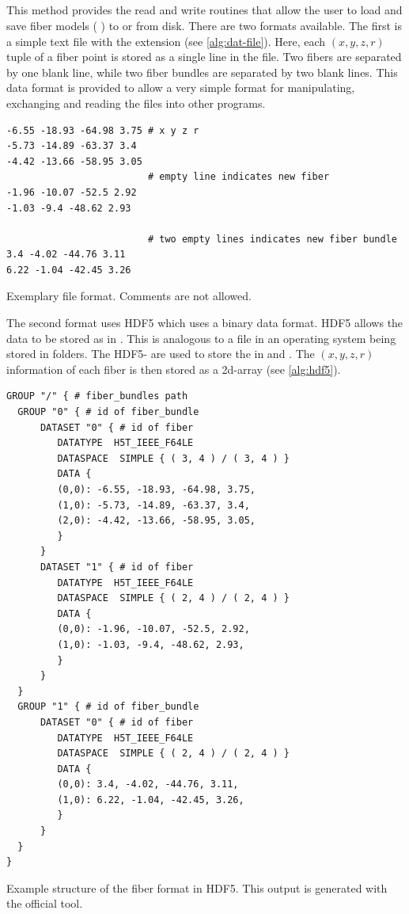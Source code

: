 \subsection{}
%
This method provides the read and write routines that allow the user to load and save fiber models (\ie{} ) to or from disk.
There are two formats available.
The first is a simple text file with the extension  (see \cref{alg:dat-file}).
Here, each $(x,y,z,r)$ tuple of a fiber point is stored as a single line in the file.
Two fibers are separated by one blank line, while two fiber bundles are separated by two blank lines.
This data format is provided to allow a very simple format for manipulating, exchanging and \eg{} reading the files into other programs.
\par
%
\begin{lstfloat}[!ht]
\begin{lstlisting}
-6.55 -18.93 -64.98 3.75 # x y z r
-5.73 -14.89 -63.37 3.4
-4.42 -13.66 -58.95 3.05
                         # empty line indicates new fiber
-1.96 -10.07 -52.5 2.92
-1.03 -9.4 -48.62 2.93

                         # two empty lines indicates new fiber bundle
3.4 -4.02 -44.76 3.11
6.22 -1.04 -42.45 3.26
\end{lstlisting}
\caption{Exemplary  file format. Comments are not allowed.}\label{alg:dat-file}
\end{lstfloat}
%
The second format uses \ac{HDF5} \cite{hdf5} which uses a binary data format.
\ac{HDF5} allows the data to be stored as  in .
This is analogous to a file in an operating system being stored in folders.
The \ac{HDF5}- are used to store the  in  and .
The $(x,y,z,r)$ information of each fiber is then stored as a 2d-array (see \cref{alg:hdf5}).
%
\begin{lstfloat}[!ht]
\begin{lstlisting}
GROUP "/" { # fiber_bundles path
  GROUP "0" { # id of fiber_bundle
      DATASET "0" { # id of fiber
         DATATYPE  H5T_IEEE_F64LE
         DATASPACE  SIMPLE { ( 3, 4 ) / ( 3, 4 ) }
         DATA {
         (0,0): -6.55, -18.93, -64.98, 3.75,
         (1,0): -5.73, -14.89, -63.37, 3.4,
         (2,0): -4.42, -13.66, -58.95, 3.05,
         }
      }
      DATASET "1" { # id of fiber
         DATATYPE  H5T_IEEE_F64LE
         DATASPACE  SIMPLE { ( 2, 4 ) / ( 2, 4 ) }
         DATA {
         (0,0): -1.96, -10.07, -52.5, 2.92,
         (1,0): -1.03, -9.4, -48.62, 2.93,
         }
      }
  }
  GROUP "1" { # id of fiber_bundle
      DATASET "0" { # id of fiber
         DATATYPE  H5T_IEEE_F64LE
         DATASPACE  SIMPLE { ( 2, 4 ) / ( 2, 4 ) }
         DATA {
         (0,0): 3.4, -4.02, -44.76, 3.11,
         (1,0): 6.22, -1.04, -42.45, 3.26,
         }
      }
  }
}
\end{lstlisting}
\caption{Example structure of the fiber format in \ac{HDF5}. This output is generated with the official  tool.}
\label{alg:hdf5}
\end{lstfloat}
%
%
%
